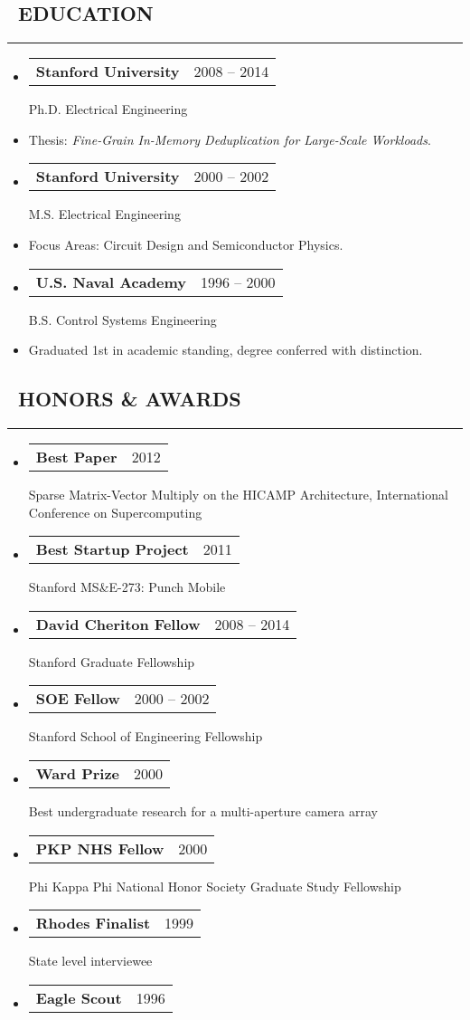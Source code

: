 \documentclass[10pt,letterpaper]{article}
\makeatletter
\newenvironment{resumesection}[1]
{%
    \subsection*{\ \textcolor{light-gray}{#1} }
    \vspace{-0.4em}
    \begin{samepage}
    \hrule
    \end{samepage}
    \vspace{+0.4em}
    \begin{itemize}[leftmargin=0.15cm]
        \parskip=0.1em
}%
{%
    \end{itemize}
}%
\newcommand{\headerrowx}[2]
{\item[] \begin{tabular*}{\linewidth}{l@{\extracolsep{\fill}}r}
	#1 &
	#2 \\
\end{tabular*}}
\newcommand{\lminiw}{0.375}
\makeatother
\begin{document}
\begin{minipage}[t]{\lminiw\textwidth}
\begin{resumesection}{EDUCATION}
    \headerrowx{\textbf{Stanford University}}{2008 -- 2014}
    
    Ph.D. Electrical Engineering
    \item[] Thesis: \emph{Fine-Grain In-Memory Deduplication for Large-Scale Workloads}.
    
    \headerrowx{\textbf{Stanford University}}{2000 -- 2002}
    
    M.S. Electrical Engineering
    \item[] Focus Areas: Circuit Design and Semiconductor Physics.
    
    \headerrowx{\textbf{U.S. Naval Academy}}{1996 -- 2000}
    
    B.S. Control Systems Engineering
    \item[] Graduated 1st in academic standing, degree conferred with distinction.
\end{resumesection}

\begin{resumesection}{HONORS \& AWARDS}
    \headerrowx{\textbf{Best Paper}}{2012}
    
    Sparse Matrix-Vector Multiply on the {{HICAMP}} Architecture, International Conference on Supercomputing
    
    \headerrowx{\textbf{Best Startup Project}}{2011}
    
    Stanford MS\&E-273: Punch Mobile
    
    \headerrowx{\textbf{David Cheriton Fellow}}{2008 -- 2014}
    
    Stanford Graduate Fellowship
    
    \headerrowx{\textbf{SOE Fellow}}{2000 -- 2002}
    
    Stanford School of Engineering Fellowship
    
    \headerrowx{\textbf{Ward Prize}}{2000}
    
    Best undergraduate research for a multi-aperture camera array
    
    \headerrowx{\textbf{PKP NHS Fellow}}{2000}
    
    Phi Kappa Phi National Honor Society Graduate Study Fellowship
    
    \headerrowx{\textbf{Rhodes Finalist}}{1999}
    
    State level interviewee
    
    \headerrowx{\textbf{Eagle Scout}}                       {1996}
\end{resumesection}

\end{minipage}
\end{document}
